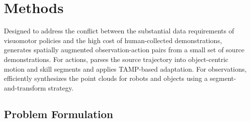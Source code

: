 






\section{\method Methods}


Designed to address the conflict between the substantial data requirements of visuomotor policies and the high cost of human-collected demonstrations, \method generates spatially augmented observation-action pairs from a small set of source demonstrations. For actions, \method parses the source trajectory into object-centric motion and skill segments and applies TAMP-based adaptation. For observations, \method efficiently synthesizes the point clouds for robots and objects using a segment-and-transform strategy.

\subsection{Problem Formulation}




